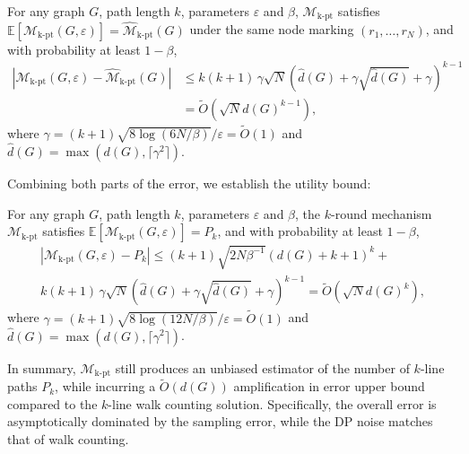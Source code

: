\begin{lemma}
    \label{lem:k-lp_additive_bound}
    For any graph $G$, path length $k$, parameters $\varepsilon$ and $\beta$, 
$\mathcal{M}_{\mathrm{k\text{-}pt}}$ satisfies
$
    \mathbb{E}[\mathcal{M}_{\mathrm{k\text{-}pt}}(G, \varepsilon)]
    =  
    \widehat{\mathcal{M}}_{\mathrm{k\text{-}pt}}(G)$
under the same node marking $(r_1, \dots, r_N)$, 
and with probability at least $1 - \beta$,
\begin{align*}
    |\mathcal{M}_{\mathrm{k\text{-}pt}}(G, \varepsilon) - 
    \widehat{\mathcal{M}}_{\mathrm{k\text{-}pt}}(G)| 
    &\leq 
    {k(k+1)} \,
    \gamma
    \sqrt{N}
    (\hat{d}(G) + \gamma \sqrt{\hat{d}(G)} + \gamma)^{k-1} 
    \\
    &=  \tilde{O}(\sqrt{N} d(G)^{k-1}),
\end{align*}
where $\gamma = (k+1)\sqrt{8\log(6N/\beta)}/\varepsilon = \tilde{O}(1) $ and $\hat{d}(G) = \max(d(G), \lceil\gamma^2\rceil)$.
\end{lemma}
Combining both parts of the error, we establish the utility bound:
\begin{theorem}
\label{the:k-lp_bound}
    For any graph $G$, path length $k$, parameters $\varepsilon$ and $\beta$, the $k$-round mechanism $\mathcal{M}_{\mathrm{k\text{-}pt}}$ satisfies $
    \mathbb{E}[\mathcal{M}_{\mathrm{k\text{-}pt}}(G, \varepsilon)] =  
    P_k$,
and with probability at least $1 - \beta$,
\begin{align*}
    |\mathcal{M}_{\mathrm{k\text{-}pt}}(G, \varepsilon) - 
    P_k|  \leq  (k+1) \sqrt{2N\beta^{-1}}(d(G)+k+1)^k + \\ 
          {k(k+1)} \, 
        \gamma
        \sqrt{N}
        (\hat{d}(G) + \gamma \sqrt{\hat{d}(G)} + \gamma)^{k-1} 
          =  \tilde{O}(\sqrt{N} d(G)^{k}),
\end{align*}
where $\gamma = (k+1)\sqrt{8\log(12N/\beta)}/\varepsilon = \tilde{O}(1) $ and $\hat{d}(G) = \max(d(G), \lceil\gamma^2\rceil)$.
\end{theorem}



In summary, $\mathcal{M}_{\mathrm{k\text{-}pt}}$ still produces an unbiased estimator of the number of $k$-line paths $P_k$, while incurring a $\tilde{O}(d(G))$ amplification in error upper bound compared to the $k$-line walk counting solution.
Specifically, the overall error is asymptotically dominated by the sampling error, while the {DP noise} matches that of walk counting. 




